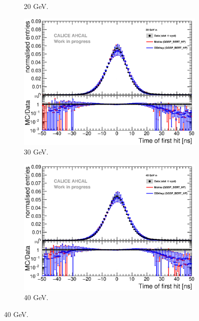 \begin{figure}[htbp!]
\begin{subfigure}[t]{0.49\textwidth}
    \caption{20 GeV.}\label{fig:elec_sim_data_20GeV}
  \end{subfigure}
  \hfill
  \begin{subfigure}[t]{0.49\textwidth}
    \centering
    \includegraphics[width=1\textwidth]{../Thesis_Plots/Timing/Electrons/Plots/Comparison_SimData_Electrons30GeV.eps}
    \caption{30 GeV.}\label{fig:elec_sim_data_30GeV}
  \end{subfigure}
  \hfill
  \begin{subfigure}[t]{0.49\textwidth}
    \centering
    \includegraphics[width=1\textwidth]{../Thesis_Plots/Timing/Electrons/Plots/Comparison_SimData_Electrons40GeV.eps}
    \caption{40 GeV.}\label{fig:elec_sim_data_40GeV}
  \end{subfigure}

\end{figure}

